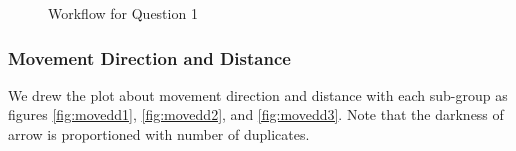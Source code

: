 \documentclass[aps, 10pt, a4paper]{article}
\begin{document}
                \begin{figure}[htbp]
                    \centering
                    \caption{Workflow for Question 1}
                    \label{fig:workflow1}
                \end{figure}
        
            \subsubsection{Movement Direction and Distance}
                We drew the plot about movement direction and distance with each sub-group as figures \ref{fig:movedd1}, \ref{fig:movedd2}, and \ref{fig:movedd3}. Note that the darkness of arrow is proportioned with number of duplicates. 
            
\end{document}
